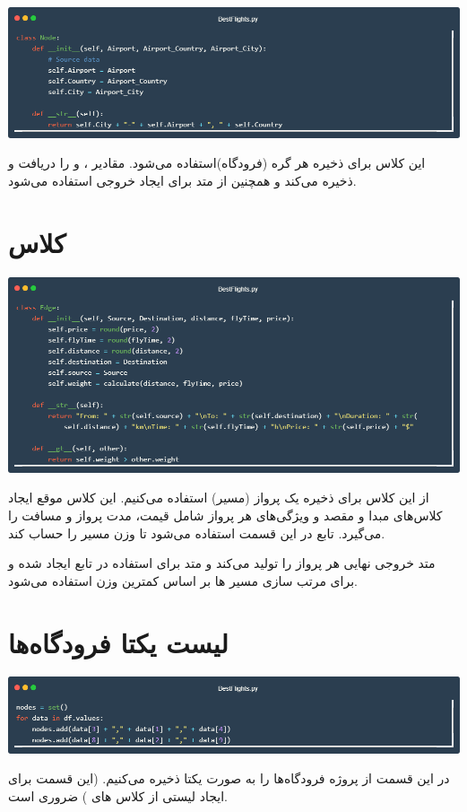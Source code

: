 \documentclass[12pt, dvipsnames, svgnames, x11names,]{article}
\begin{document}
		{\includegraphics[width=14cm]{images/code04}} \par
		{\normalsize این کلاس برای ذخیره هر گره (فرودگاه)استفاده می‌شود. مقادیر ،‌  و  را دریافت و ذخیره می‌کند و همچنین از متد  برای ایجاد خروجی استفاده می‌شود.}
		
		
	\section{کلاس } \label{edge_class}
		
		{\includegraphics[width=14cm]{images/code05}} \par
		{\normalsize از این کلاس برای ذخیره یک پرواز (مسیر) استفاده می‌کنیم. این کلاس موقع ایجاد کلاس‌های مبدا و مقصد و ویژگی‌های هر پرواز شامل قیمت، مدت پرواز و مسافت را می‌گیرد.
		تابع  در این قسمت استفاده می‌شود تا وزن مسیر را حساب کند. \par
		متد  خروجی نهایی هر پرواز را تولید می‌کند و متد  برای استفاده در تابع  ایجاد شده و برای مرتب سازی مسیر ها بر اساس کمترین وزن استفاده می‌شود.}
	
	
	\section{لیست یکتا فرودگاه‌ها} \label{unique_nodes}
	
		{\includegraphics[width=14cm]{images/code06}} \par
		{\normalsize در این قسمت از پروژه فرودگاه‌ها را به صورت یکتا  ذخیره می‌کنیم.
	(این قسمت برای ایجاد لیستی از کلاس های ) ضروری است.}
	
\end{document}
